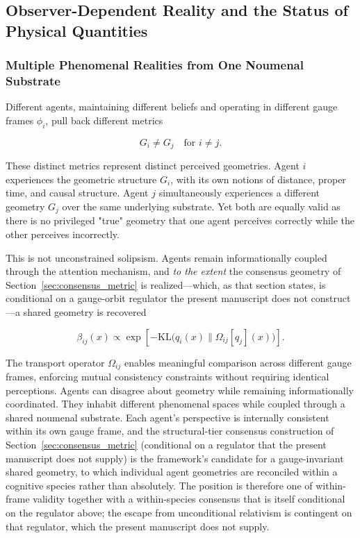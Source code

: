\documentclass[11pt]{article}
\begin{document}
\subsection{Observer-Dependent Reality and the Status of Physical Quantities}
\label{sec:observer}

\subsubsection{Multiple Phenomenal Realities from One Noumenal Substrate}

Different agents, maintaining different beliefs and operating in different gauge frames $\phi_i$, pull back different metrics

\begin{equation}
G_i \neq G_j \quad \text{for } i \neq j.
\end{equation}

These distinct metrics represent distinct perceived geometries. Agent $i$ experiences the geometric structure $G_i$, with its own notions of distance, proper time, and causal structure. Agent $j$ simultaneously experiences a different geometry $G_j$ over the same underlying substrate. Yet both are equally valid as there is no privileged "true" geometry that one agent perceives correctly while the other perceives incorrectly.

This is not unconstrained solipsism. Agents remain informationally coupled through the attention mechanism, and \emph{to the extent} the consensus geometry of Section~\ref{sec:consensus_metric} is realized---which, as that section states, is conditional on a gauge-orbit regulator the present manuscript does not construct---a shared geometry is recovered

\begin{equation}
\beta_{ij}(x) \propto \exp\left[-\mathrm{KL}\big(q_i(x) \| \Omega_{ij}[q_j](x)\big)\right].
\end{equation}

The transport operator $\Omega_{ij}$ enables meaningful comparison across different gauge frames, enforcing mutual consistency constraints without requiring identical perceptions. Agents can disagree about geometry while remaining informationally coordinated.  They inhabit different phenomenal spaces while coupled through a shared noumenal substrate. Each agent's perspective is internally consistent within its own gauge frame, and the structural-tier consensus construction of Section~\ref{sec:consensus_metric} (conditional on a regulator that the present manuscript does not supply) is the framework's candidate for a gauge-invariant shared geometry, to which individual agent geometries are reconciled within a cognitive species rather than absolutely. The position is therefore one of within-frame validity together with a within-species consensus that is itself conditional on the regulator above; the escape from unconditional relativism is contingent on that regulator, which the present manuscript does not supply.
\end{document}
